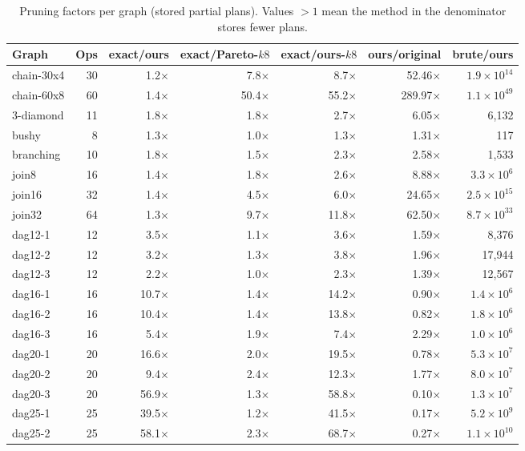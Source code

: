 \documentclass[10pt,a4paper]{article}
\begin{document}
\begin{longtable}{@{}lr|rrr|rr@{}}
\caption{Pruning factors per graph (stored partial plans). Values $>1$ mean the method in the denominator stores fewer plans.}\label{tab:ratios}\\
\toprule
Graph & Ops & exact/ours & exact/Pareto-$k8$ & exact/ours-$k8$ & ours/original & brute/ours\\
\midrule\endhead
chain-30x4 & 30 & 1.2$\times$ & 7.8$\times$ & 8.7$\times$ & 52.46$\times$ & $1.9\times10^{14}$\\
chain-60x8 & 60 & 1.4$\times$ & 50.4$\times$ & 55.2$\times$ & 289.97$\times$ & $1.1\times10^{49}$\\
3-diamond & 11 & 1.8$\times$ & 1.8$\times$ & 2.7$\times$ & 6.05$\times$ & 6{,}132\\
bushy & 8 & 1.3$\times$ & 1.0$\times$ & 1.3$\times$ & 1.31$\times$ & 117\\
branching & 10 & 1.8$\times$ & 1.5$\times$ & 2.3$\times$ & 2.58$\times$ & 1{,}533\\
join8 & 16 & 1.4$\times$ & 1.8$\times$ & 2.6$\times$ & 8.88$\times$ & $3.3\times10^{6}$\\
join16 & 32 & 1.4$\times$ & 4.5$\times$ & 6.0$\times$ & 24.65$\times$ & $2.5\times10^{15}$\\
join32 & 64 & 1.3$\times$ & 9.7$\times$ & 11.8$\times$ & 62.50$\times$ & $8.7\times10^{33}$\\
dag12-1 & 12 & 3.5$\times$ & 1.1$\times$ & 3.6$\times$ & 1.59$\times$ & 8{,}376\\
dag12-2 & 12 & 3.2$\times$ & 1.3$\times$ & 3.8$\times$ & 1.96$\times$ & 17{,}944\\
dag12-3 & 12 & 2.2$\times$ & 1.0$\times$ & 2.3$\times$ & 1.39$\times$ & 12{,}567\\
dag16-1 & 16 & 10.7$\times$ & 1.4$\times$ & 14.2$\times$ & 0.90$\times$ & $1.4\times10^{6}$\\
dag16-2 & 16 & 10.4$\times$ & 1.4$\times$ & 13.8$\times$ & 0.82$\times$ & $1.8\times10^{6}$\\
dag16-3 & 16 & 5.4$\times$ & 1.9$\times$ & 7.4$\times$ & 2.29$\times$ & $1.0\times10^{6}$\\
dag20-1 & 20 & 16.6$\times$ & 2.0$\times$ & 19.5$\times$ & 0.78$\times$ & $5.3\times10^{7}$\\
dag20-2 & 20 & 9.4$\times$ & 2.4$\times$ & 12.3$\times$ & 1.77$\times$ & $8.0\times10^{7}$\\
dag20-3 & 20 & 56.9$\times$ & 1.3$\times$ & 58.8$\times$ & 0.10$\times$ & $1.3\times10^{7}$\\
dag25-1 & 25 & 39.5$\times$ & 1.2$\times$ & 41.5$\times$ & 0.17$\times$ & $5.2\times10^{9}$\\
dag25-2 & 25 & 58.1$\times$ & 2.3$\times$ & 68.7$\times$ & 0.27$\times$ & $1.1\times10^{10}$\\
\bottomrule
\end{longtable}
\end{document}
